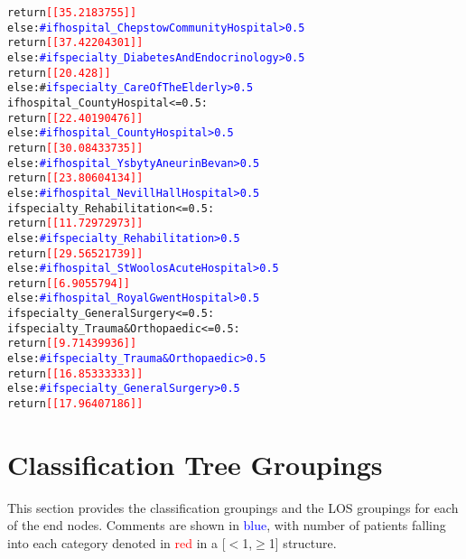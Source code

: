 \documentclass[thesis.tex]{subfiles}
\begin{document}
{\begin{alltt}
                                            return \textcolor{red}{[[35.2183755]]}
                                    else:  \textcolor{blue}{# if hospital_Chepstow Community Hospital > 0.5}
                                        return \textcolor{red}{[[37.42204301]]}
                            else:  \textcolor{blue}{# if specialty_Diabetes And Endocrinology > 0.5}
                                return \textcolor{red}{[[20.428]]}
                        else:  #\textcolor{blue}{ if specialty_Care Of The Elderly > 0.5}
                            if hospital_County Hospital <= 0.5:
                                return \textcolor{red}{[[22.40190476]]}
                            else:  \textcolor{blue}{# if hospital_County Hospital > 0.5}
                                return \textcolor{red}{[[30.08433735]]}
                    else:  \textcolor{blue}{# if hospital_Ysbyty Aneurin Bevan > 0.5}
                        return \textcolor{red}{[[23.80604134]]}
                else:  \textcolor{blue}{# if hospital_Nevill Hall Hospital > 0.5}
                    if specialty_Rehabilitation <= 0.5:
                        return \textcolor{red}{[[11.72972973]]}
                    else: \textcolor{blue}{# if specialty_Rehabilitation > 0.5}
                        return \textcolor{red}{[[29.56521739]]}
            else: \textcolor{blue}{# if hospital_St Woolos Acute Hospital > 0.5}
                return \textcolor{red}{[[6.9055794]]}
        else:  \textcolor{blue}{# if hospital_Royal Gwent Hospital > 0.5}
            if specialty_General Surgery <= 0.5:
                if specialty_Trauma & Orthopaedic <= 0.5:
                    return \textcolor{red}{[[9.71439936]]}
                else: \textcolor{blue}{# if specialty_Trauma & Orthopaedic > 0.5}
                    return \textcolor{red}{[[16.85333333]]}
            else:  \textcolor{blue}{# if specialty_General Surgery > 0.5}
                return \textcolor{red}{[[17.96407186]]}
\end{alltt}}

\section{Classification Tree Groupings}\label{app:secclassification}
This section provides the classification groupings and the LOS groupings for each of the end nodes. Comments are shown in \textcolor{blue}{blue}, with number of patients falling into each category denoted in \textcolor{red}{red} in a [$<$1,$\geq$1] structure. 
\end{document}
